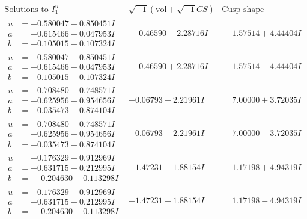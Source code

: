 \documentclass[1p]{elsarticle_modified}
\theoremstyle{definition}
\newcommand{\I}{\sqrt{-1}}
\begin{document}
$$\begin{array}{c|c|c}  
\text{Solutions to }I^u_{1}& \I (\text{vol} + \sqrt{-1}CS) & \text{Cusp shape}\\
 \hline 
\begin{aligned}
u &= -0.580047 + 0.850451 I \\
a &= -0.615466 - 0.047953 I \\
b &= -0.105015 + 0.107324 I\end{aligned}
 & \phantom{-}0.46590 - 2.28716 I & \phantom{-}1.57514 + 4.44404 I \\ \hline\begin{aligned}
u &= -0.580047 - 0.850451 I \\
a &= -0.615466 + 0.047953 I \\
b &= -0.105015 - 0.107324 I\end{aligned}
 & \phantom{-}0.46590 + 2.28716 I & \phantom{-}1.57514 - 4.44404 I \\ \hline\begin{aligned}
u &= -0.708480 + 0.748571 I \\
a &= -0.625956 - 0.954656 I \\
b &= -0.035473 + 0.874104 I\end{aligned}
 & -0.06793 - 2.21961 I & \phantom{-}7.00000 + 3.72035 I \\ \hline\begin{aligned}
u &= -0.708480 - 0.748571 I \\
a &= -0.625956 + 0.954656 I \\
b &= -0.035473 - 0.874104 I\end{aligned}
 & -0.06793 + 2.21961 I & \phantom{-}7.00000 - 3.72035 I \\ \hline\begin{aligned}
u &= -0.176329 + 0.912969 I \\
a &= -0.631715 + 0.212995 I \\
b &= \phantom{-}0.204630 + 0.113298 I\end{aligned}
 & -1.47231 - 1.88154 I & \phantom{-}1.17198 + 4.94319 I \\ \hline\begin{aligned}
u &= -0.176329 - 0.912969 I \\
a &= -0.631715 - 0.212995 I \\
b &= \phantom{-}0.204630 - 0.113298 I\end{aligned}
 & -1.47231 + 1.88154 I & \phantom{-}1.17198 - 4.94319 I \\ \hline\begin{aligned}

\end{aligned}
\end{array}$$
\end{document}
